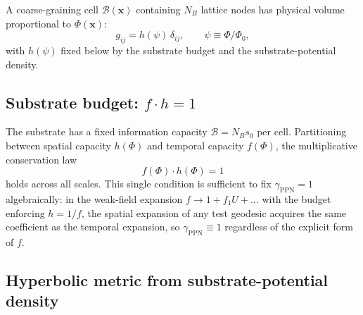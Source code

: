 \documentclass[11pt,a4paper]{article}
\renewcommand{\Phi}{\varPhi}
\newcommand{\PhiZero}{\varPhi_{0}}
\begin{document}
A coarse-graining cell $\mathcal{B}(\mathbf{x})$ containing $N_{B}$
lattice nodes has physical volume proportional to $\Phi(\mathbf{x})$:
\begin{equation}\label{eq:g-spatial}
  g_{ij}=h(\psi)\,\delta_{ij},
  \qquad \psi\equiv\Phi/\PhiZero,
\end{equation}
with $h(\psi)$ fixed below by the substrate budget and
the substrate-potential density.

\subsection{Substrate budget: $f\cdot h=1$}

The substrate has a fixed information capacity $\mathcal{B}=N_{B}s_{0}$ per
cell. Partitioning between spatial capacity $h(\Phi)$ and temporal
capacity $f(\Phi)$, the multiplicative conservation law
\begin{equation}\label{eq:fh-1}
  f(\Phi)\cdot h(\Phi)=1
\end{equation}
holds across all scales. This single condition is sufficient to fix
$\gamma_{\mathrm{PPN}}=1$ algebraically: in the weak-field expansion
$f\to 1+f_{1}U+\ldots$ with the budget enforcing $h=1/f$, the spatial
expansion of any test geodesic acquires the same coefficient as the
temporal expansion, so $\gamma_{\mathrm{PPN}}\equiv 1$ regardless of
the explicit form of $f$.

\subsection{Hyperbolic metric from substrate-potential density}
\end{document}
